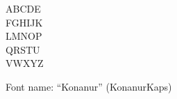 \documentclass[a4paper]{article}
\begin{document}
\begin{center}
\fontsize{60pt}{72pt}
  ABCDE \\
  FGHIJK \\
  LMNOP \\
  QRSTU \\
  VWXYZ \\
\end{center}
\vfill
\begin{center}
Font name: ``Konanur'' (KonanurKaps)
\end{center}
\end{document}
